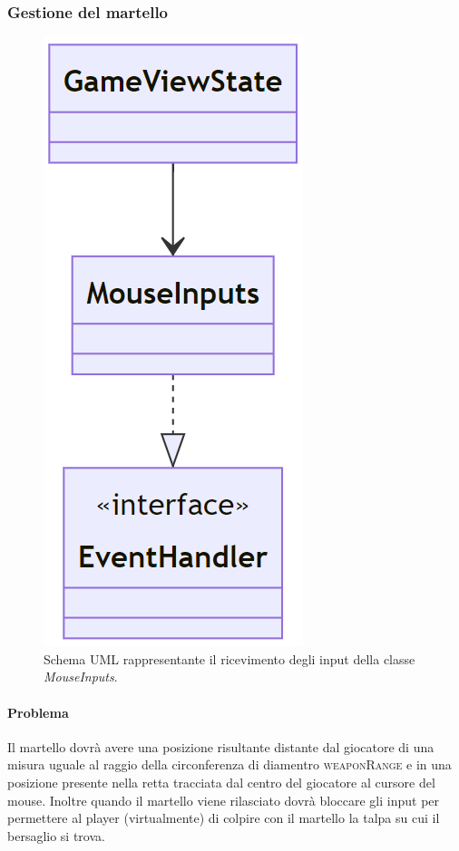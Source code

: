 \documentclass[a4paper,12pt]{report}
\begin{document}
\subsubsection{Gestione del martello}
\begin{figure}[H]
\centering{}
\includegraphics[scale = 0.5]{img/MouseInputsUML.PNG}
\caption{Schema UML rappresentante il ricevimento degli input della classe \emph{MouseInputs}.}
\end{figure}
\paragraph{Problema}
    Il martello dovrà avere una posizione risultante distante dal giocatore di una misura uguale al raggio della circonferenza 
    di diamentro \textsc{weaponRange} e in una posizione presente nella retta tracciata dal centro del giocatore al cursore del mouse.
    Inoltre quando il martello viene rilasciato dovrà bloccare gli input per permettere al player (virtualmente) di colpire con 
    il martello la talpa su cui il bersaglio si trova.
\end{document}

